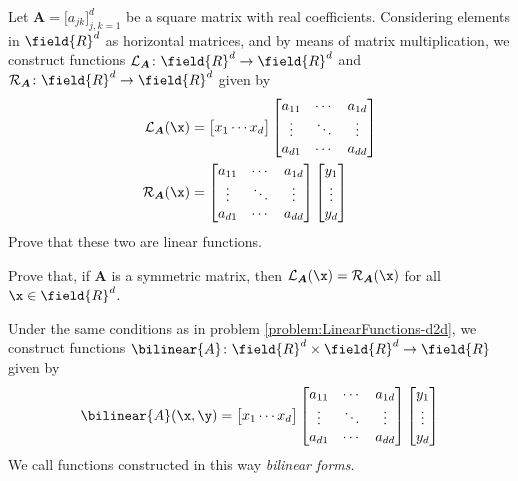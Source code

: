 \begin{problem}\label{problem:LinearFunctions-d2d}
Let $\boldsymbol{A} = \big[ a_{jk} \big]_{j,k=1}^d$ be a square matrix with real coefficients.  Considering elements in $\field{R}^d$ as horizontal matrices, and by means of matrix multiplication, we construct functions $\mathcal{L}_{\boldsymbol{A}} \colon \field{R}^d \to \field{R}^d$ and $\mathcal{R}_{\boldsymbol{A}} \colon \field{R}^d \to \field{R}^d$ given by
\begin{align*}
\mathcal{L}_{\boldsymbol{A}}(\x) &= \begin{bmatrix} x_1 \dotsb x_d \end{bmatrix} \begin{bmatrix} a_{11} &\dotsb &a_{1d} \\ \vdots & \ddots & \vdots \\ a_{d1} &\dotsb &a_{dd} \end{bmatrix} \\
\mathcal{R}_{\boldsymbol{A}}(\x) &= \begin{bmatrix} a_{11} &\dotsb &a_{1d} \\ \vdots & \ddots & \vdots \\ a_{d1} &\dotsb &a_{dd} \end{bmatrix} \begin{bmatrix} y_1 \\ \vdots \\ y_d \end{bmatrix}
\end{align*}
Prove that these two are linear functions.
\end{problem}

\begin{problem}
Prove that, if $\boldsymbol{A}$ is a symmetric matrix, then $\mathcal{L}_{\boldsymbol{A}}(\x) = \mathcal{R}_{\boldsymbol{A}}(\x)$ for all $\x \in \field{R}^d$.
\end{problem}

\begin{example}\label{example:BilinearForm}
Under the same conditions as in problem \ref{problem:LinearFunctions-d2d}, we construct functions $\bilinear{A} \colon \field{R}^d \times \field{R}^d \to \field{R}$ given by
\begin{equation*}
\bilinear{A}(\x, \y) = \begin{bmatrix} x_1 \dotsb x_d \end{bmatrix} \begin{bmatrix} a_{11} &\dotsb &a_{1d} \\ \vdots & \ddots & \vdots \\ a_{d1} &\dotsb &a_{dd} \end{bmatrix} \begin{bmatrix} y_1 \\ \vdots \\ y_d \end{bmatrix}
\end{equation*}
We call functions constructed in this way \emph{bilinear forms}.
\end{example}

